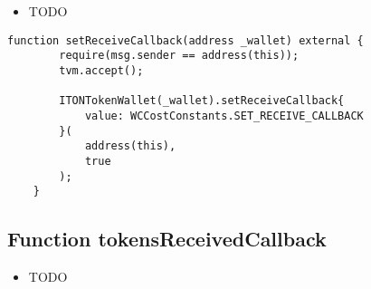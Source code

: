 \noindent\begin{itemize}
\item TODO
\end{itemize}

\begin{lstlisting}[firstnumber=206]
    function setReceiveCallback(address _wallet) external {
        require(msg.sender == address(this));
        tvm.accept();

        ITONTokenWallet(_wallet).setReceiveCallback{
            value: WCCostConstants.SET_RECEIVE_CALLBACK
        }(
            address(this),
            true
        );
    }
\end{lstlisting}

\subsection{Function tokensReceivedCallback}

\noindent\begin{itemize}
\item TODO
\end{itemize}

